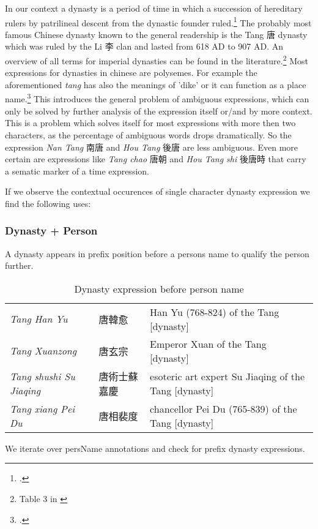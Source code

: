 \documentclass[12pt, draft]{article}
\begin{document}
In our context a dynasty is a period of time in which a succession of hereditary
rulers by patrilineal descent from the dynastic founder ruled.\footcite[3]{Wilkinson:2012} 
The probably most famous Chinese dynasty known to the general readership
is the Tang 唐 dynasty which was ruled by the Li 李 clan and lasted from 618 AD to 907 AD.
An overview of all terms for imperial dynasties can be found in the literature.\footnote{
Table 3 in \cite[4]{Wilkinson:2012}}
Most expressions for dynasties in chinese are polysemes. For example the aforementioned
\emph{tang} has also the meanings of 'dike' or it can function as a place name.\footcite[117]{Wang:2000}
This introduces the general problem of ambiguous expressions, which can only be solved
by further analysis of the expression itself or/and by more context. This is a problem
which solves itself for most expressions with more then two characters, as the percentage
of ambiguous words drops dramatically. So the expression \emph{Nan Tang} 南唐
and \emph{Hou Tang} 後唐 are less ambiguous. Even more certain are expressions like
\emph{Tang chao} 唐朝 and \emph{Hou Tang shi} 後唐時 that carry a sematic marker
of a time expression.

If we observe the contextual occurences of single character dynasty expression we find the
following uses:

\subsubsection{Dynasty + Person}
A dynasty appears in prefix position before a persons name to qualify the person further.

{\tiny
\begin{table}[h]
\caption{Dynasty expression before person name}
\begin{tabular}{lll}
\emph{Tang Han Yu} & 唐韓愈 & Han Yu (768-824) of the Tang [dynasty] \\
\emph{Tang Xuanzong} & 唐玄宗 & Emperor Xuan of the Tang [dynasty] \\
\emph{Tang shushi Su Jiaqing} &  唐術士蘇嘉慶 & esoteric art expert Su Jiaqing of the Tang [dynasty] \\
\emph{Tang xiang Pei Du} &  唐相裴度 & chancellor Pei Du (765-839) of the Tang [dynasty] \\
\end{tabular}
\end{table}
}

We iterate over persName annotations and check for prefix dynasty expressions.
\end{document}
